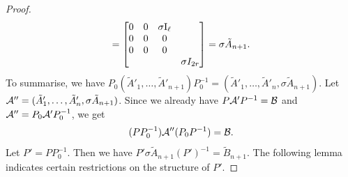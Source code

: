 \begin{proof}
\begin{eqnarray*}
		=
		\begin{bmatrix}
			0 & 0 & \sigma \mathrm{I}_\ell \\
			0 & 0 & 0 \\
			0 & 0 & 0 \\
			& & & \sigma I_{2r}
		\end{bmatrix}
		= \sigma \tilde A_{n+1}.
	\end{eqnarray*}
	To summarise, we have $P_0(\tilde A'_1, \dotsc, \tilde A'_{n+1})P_0^{-1} = (\tilde A'_1, \dotsc, \tilde A'_{n}, \sigma \tilde A_{n+1})$. Let $\mathcal{A}'' = ( \tilde A'_1, \dotsc, \tilde A'_{n}, \sigma \tilde A_{n+1} )$. Since we already have $P \mathcal{A}' P^{-1} = \mathcal{B}$ and $\mathcal{A}'' = P_0 \mathcal{A}' P_0^{-1}$, we get 
	\[
	(P P_0^{-1}) \mathcal{A}'' (P_0 P^{-1}) = \mathcal{B}.
	\]
	Let $P' = P P_0^{-1}$. Then we have $P' \sigma \tilde A_{n+1} (P')^{-1} = \tilde B_{n+1}$. The following lemma indicates certain restrictions on the structure of $P'$.
	

\end{proof}
